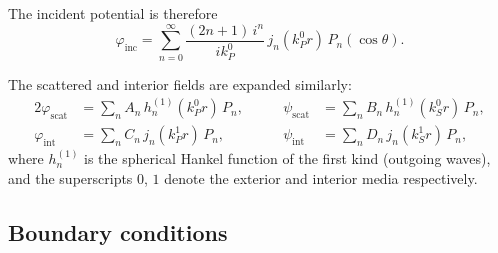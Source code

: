 \documentclass[11pt,a4paper]{article}
\begin{document}
The incident potential is therefore
\begin{equation}
  \varphi_\text{inc}
  = \sum_{n=0}^{\infty} \frac{(2n+1)\,i^n}{ik_P^0}\,
    j_n(k_P^0 r)\,P_n(\cos\theta).
  \label{eq:phi_inc}
\end{equation}

The scattered and interior fields are expanded similarly:
\begin{alignat}{2}
  \varphi_\text{scat} &= \sum_n A_n\,h_n^{(1)}(k_P^0 r)\,P_n,
  &\qquad
  \psi_\text{scat} &= \sum_n B_n\,h_n^{(1)}(k_S^0 r)\,P_n,
  \label{eq:scat_potentials} \\[4pt]
  \varphi_\text{int}  &= \sum_n C_n\,j_n(k_P^1 r)\,P_n,
  &\qquad
  \psi_\text{int}  &= \sum_n D_n\,j_n(k_S^1 r)\,P_n,
  \label{eq:int_potentials}
\end{alignat}
where $h_n^{(1)}$ is the spherical Hankel function of the first kind
(outgoing waves), and the superscripts $0$, $1$ denote the exterior
and interior media respectively.

\subsection{Boundary conditions}
\end{document}
